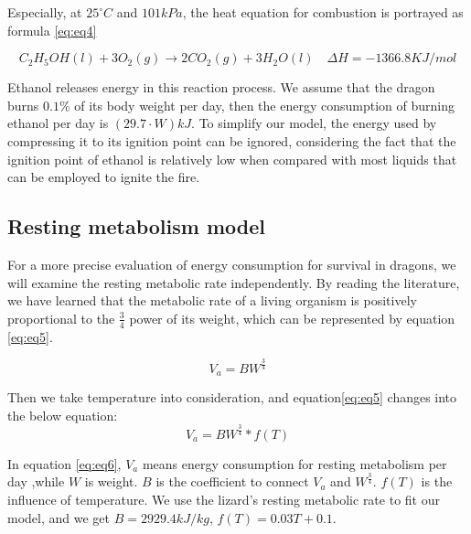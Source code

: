\documentclass[12pt]{article}  %
\newenvironment{shrinkeq}[1]
{ \bgroup
	\addtolength\abovedisplayshortskip{#1}
	\addtolength\abovedisplayskip{#1}
	\addtolength\belowdisplayshortskip{#1}
	\addtolength\belowdisplayskip{#1}}
{\egroup\ignorespacesafterend}
\begin{document}
Especially, at $25 ^{\circ}C$ and $101 kPa$, the heat equation for combustion is portrayed as formula \eqref{eq:eq4}

\begin{shrinkeq}{-1ex}
	\begin{equation}
    \label{eq:eq4}
	   C_2H_5OH(l) + 3O_2(g) \rightarrow 2CO_2(g) + 3H_2O(l) \quad \Delta H = -1366.8 KJ/mol
	\end{equation}
\end{shrinkeq}

Ethanol releases energy in this reaction process. We assume that the dragon burns $0.1\%$  of its body weight per day, then the energy consumption of burning ethanol per day is $(29.7\cdot W) kJ$. To simplify our model, the energy used by compressing it to its ignition point can be ignored, considering the fact that the ignition point of ethanol is relatively low when compared with most liquids that can be employed to ignite the fire.

\subsection{Resting metabolism model}
For a more precise evaluation of energy consumption for survival in dragons, we will examine the resting metabolic rate independently. By reading the literature, we have learned that the metabolic rate of a living organism is positively proportional to the $\frac{3}{4}$ power of its weight, which can be represented by equation \eqref{eq:eq5}.

\begin{shrinkeq}{-1ex}
	\begin{equation}
    \label{eq:eq5}
	   V_a = BW ^{\frac{3}{4}}
	\end{equation}
\end{shrinkeq}

 Then we take temperature into consideration, and equation\eqref{eq:eq5} changes into the below equation:
\begin{shrinkeq}{-1ex}
	\begin{equation}
    \label{eq:eq6}
	   V_a = BW ^{\frac{3}{4}} * f(T)
	\end{equation}
\end{shrinkeq}

In equation \eqref{eq:eq6}, $V_a$ means energy consumption for resting metabolism per day ,while $W$ is weight. $B$ is the coefficient to connect $V_a$ and $W^\frac{3}{4}$. $f(T)$ is the influence of temperature. We use the lizard's resting metabolic rate to fit our model, and we get $B = 2929.4 kJ/kg$, $f(T) = 0.03T + 0.1$.
\end{document}
